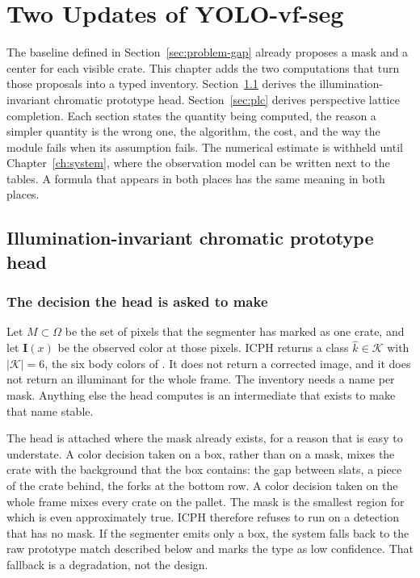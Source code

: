 \chapter{Two Updates of YOLO-vf-seg}
\label{ch:methods}

The baseline defined in Section~\ref{sec:problem-gap} already proposes a mask and a center for each visible crate. This chapter adds the two computations that turn those proposals into a typed inventory. Section~\ref{sec:icph} derives the illumination-invariant chromatic prototype head. Section~\ref{sec:plc} derives perspective lattice completion. Each section states the quantity being computed, the reason a simpler quantity is the wrong one, the algorithm, the cost, and the way the module fails when its assumption fails. The numerical estimate is withheld until Chapter~\ref{ch:system}, where the observation model can be written next to the tables. A formula that appears in both places has the same meaning in both places.

\section{Illumination-invariant chromatic prototype head}
\label{sec:icph}



\subsection{The decision the head is asked to make}
\label{sec:icph-decision}

Let $M\subset\Omega$ be the set of pixels that the segmenter has marked as one crate, and let $\mathbf{I}(x)$ be the observed color at those pixels. ICPH returns a class $\hat{k}\in\mathcal{K}$ with $\lvert\mathcal{K}\rvert=6$, the six body colors of . It does not return a corrected image, and it does not return an illuminant for the whole frame. The inventory needs a name per mask. Anything else the head computes is an intermediate that exists to make that name stable.

The head is attached where the mask already exists, for a reason that is easy to understate. A color decision taken on a box, rather than on a mask, mixes the crate with the background that the box contains: the gap between slats, a piece of the crate behind, the forks at the bottom row. A color decision taken on the whole frame mixes every crate on the pallet. The mask is the smallest region for which  is even approximately true. ICPH therefore refuses to run on a detection that has no mask. If the segmenter emits only a box, the system falls back to the raw prototype match described below and marks the type as low confidence. That fallback is a degradation, not the design.

